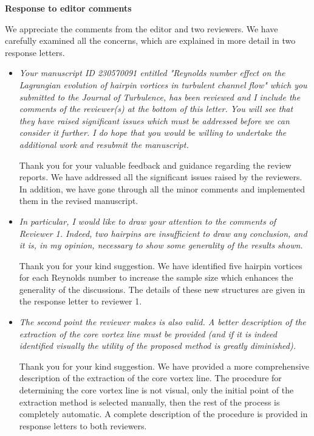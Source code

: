 \documentclass[a4paper]{article}
\begin{document}
{\Large \bf {Response to editor comments}}
\vspace{1cm}

{\textcolor{Olivegreen}{
We appreciate the comments from the editor and two reviewers. We have carefully examined all the concerns, which are explained in more detail in two response letters.}}
\begin{itemize}
	\item\textit{Your manuscript ID 230570091 entitled "Reynolds number effect on the Lagrangian evolution of hairpin vortices in turbulent channel flow" which you submitted to the Journal of Turbulence, has been reviewed and I include the comments of the reviewer(s) at the bottom of this letter. You will see that they have raised significant issues which must be addressed before we can consider it further. I do hope that you would be willing to undertake the additional work and resubmit the manuscript.}
\vspace{.2cm}

Thank you for your valuable feedback and guidance regarding the review reports. We have addressed all the significant issues raised by the reviewers. In addition, we have gone through all the minor comments and implemented them in the revised manuscript.

\item \textit{In particular, I would like to draw your attention to the comments of Reviewer 1.   Indeed, two hairpins are insufficient to draw any conclusion, and it is, in my opinion, necessary to show some generality of the results shown.}
\vspace{.2cm}

Thank you for your kind suggestion. We have identified five hairpin vortices for each Reynolds number to increase the sample size which enhances the generality of the discussions. The details of these new structures are given in the response letter to reviewer 1.



\item \textit{The second point the reviewer makes is also valid.  A better description of the extraction of the core vortex line must be provided (and if it is indeed identified visually the utility of the proposed method is greatly diminished).}
\vspace{.2cm}

Thank you for your kind suggestion. We have provided a more comprehensive description of the extraction of the core vortex line. The procedure for determining the core vortex line is not visual, only the initial point of the extraction method is selected manually, then the rest of the process is completely automatic. A complete description of the procedure is provided in response letters to both reviewers.


\end{itemize}
\end{document}
